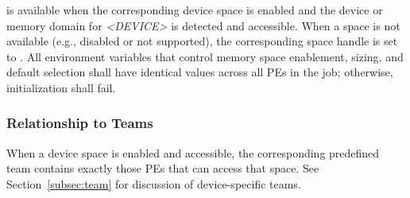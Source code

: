  is available when the corresponding
device space is enabled and the device or memory domain for \textit{<DEVICE>}
is detected and accessible. When a space is not available (e.g., disabled or
not supported), the corresponding space handle is set to
. All environment variables that control
memory space enablement, sizing, and default selection shall have identical
values across all \acp{PE} in the job; otherwise, \openshmem initialization
shall fail.

\subsubsection*{Relationship to Teams}

When a device space is enabled and accessible, the corresponding predefined
team  contains exactly those \acp{PE} that
can access that space. See Section~\ref{subsec:team} for discussion of
device-specific teams.

